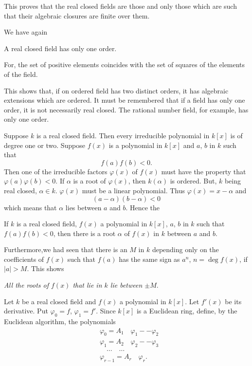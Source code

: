 This proves that the real closed fields are those and only those which
are such that their algebraic closures are finite over them.

We have again

\begin{corollary}\label{c7:cor2}%
A real closed field has only one order.
\end{corollary}

For, the set of positive elements coincides with the set of squares of
the elements of the field.

This shows that, if on ordered field has two distinct orders, it has
algebraic extensions which are ordered. It must be remembered that if
a field has only one order, it is not necessarily real closed. The
rational number field, for example, has only one order.

Suppose $k$ is a real closed field. Then every irreducible polynomial
in $k[x]$ is of degree one or two. Suppose $f(x)$ is a polynomial in
$k[x]$ and $a$, $b$ in $k$ such that 
$$
f(a) f(b) <0.
$$
Then one of the irreducible factors $\varphi(x)$ of $f(x)$ must have
the property that $\varphi(a) \varphi(b) < 0$. If $\alpha$ is a root
of $\varphi(x)$, then $k(\alpha)$ is ordered. But, $k$ being real
closed, $\alpha \in k$. $\varphi(x)$ must be a linear polynomial. Thus
$\varphi(x) = x-\alpha$ and 
$$
(a-\alpha) (b-\alpha) < 0
$$
which means that $\alpha$ lies between $a$ and $b$. Hence the 

\begin{thm}\label{chap7:thm5}%
If $k$ is a real closed field, $f(x)$ a polynomial in $k[x]$, $a$, $b$
in $k$ such that $f(a) f(b) <0$, then there is a root $\alpha$ of
$f(x)$ in $k$ between $a$ and $b$.
\end{thm}

Furthermore,\pageoriginale we had seen that there is an $M$ in $k$
depending only on the coefficients of $f(x)$ such that $f(a)$ has the
same sign as $a^n$, $n = \deg f(x)$, if $|a|>M$. This shows 

\textit{All the roots of $f(x)$ that lie in $k$ lie between $\pm M$}.

Let $k$ be a real closed field and $f(x)$ a polynomial in $k[x]$. Let
$f'(x)$ be its derivative. Put $\varphi_0 = f$, $\varphi_1 =
f'$. Since $k[x]$ is a Euclidean ring, define, by the Euclidean
algorithm, the polynomials
\begin{align*}
& \varphi_0 = A_1 \quad \varphi_1 -- \varphi_2\\
& \varphi_1 = A_2 \quad \varphi_2 -- \varphi_3\\
& \quad \ldots \quad \ldots \\ 
& \varphi_{r-1} = A_r \quad \varphi_r.
\end{align*}


